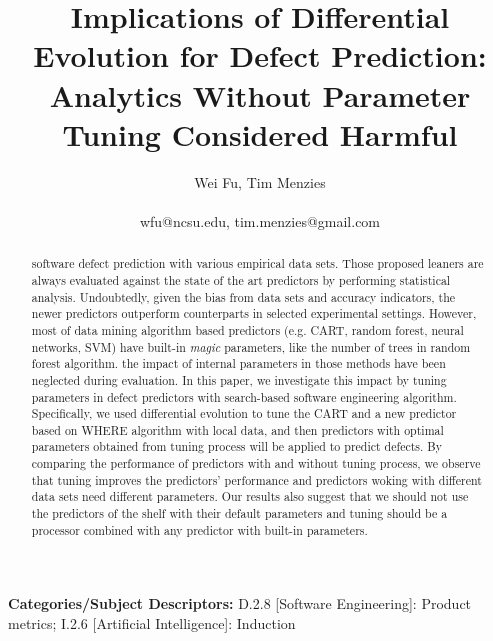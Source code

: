 \documentclass{sig-alternative}
\begin{document}
\title{Implications of Differential Evolution for  Defect Prediction:
Analytics Without Parameter Tuning Considered Harmful}
\author{
\alignauthor
Wei Fu, Tim Menzies\\
       \\
       {wfu@ncsu.edu, tim.menzies@gmail.com}} 


 
\maketitle
\begin{abstract}


software defect prediction with various 
empirical data sets. Those proposed leaners are always evaluated against the state of the art 
predictors by performing statistical analysis. Undoubtedly, given the bias from data sets and 
accuracy indicators, the newer predictors outperform counterparts in selected experimental 
settings. However,  most of data mining algorithm based predictors (e.g. CART, random 
forest, 
neural networks, SVM) have built-in {\it magic} parameters, like the number of trees in random 
forest algorithm. the impact of internal parameters in those methods have been neglected 
during evaluation. In this paper, we investigate this impact by tuning parameters in defect 
predictors with search-based software engineering algorithm. Specifically, we used differential 
evolution to tune the CART and a new predictor based on WHERE algorithm with local data, 
and then predictors with optimal parameters obtained from tuning process will be applied to 
predict defects. By comparing the performance of predictors with and without tuning process,  
we observe that tuning improves the predictors' performance and predictors woking with 
different data sets need different parameters. Our results also suggest that we should not use 
the predictors of the shelf with their default parameters and tuning should be a processor 
combined with any predictor with built-in parameters.



\end{abstract}

\vspace{1mm}
\noindent
{\bf Categories/Subject Descriptors:} 
D.2.8 [Software Engineering]: Product metrics;
I.2.6 [Artificial Intelligence]: Induction
\end{document}
